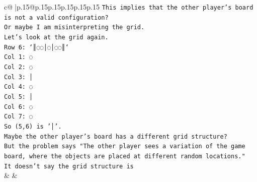 \documentclass{article}
\begin{document}
{\begin{supertabular}{c@{$\;$}|p{.15\linewidth}@{}p{.15\linewidth}p{.15\linewidth}p{.15\linewidth}p{.15\linewidth}p{.15\linewidth}}
{{{\texttt{This implies that the other player's board is not a valid configuration?} \\
\texttt{Or maybe I am misinterpreting the grid.} \\
\texttt{Let's look at the grid again.} \\
\texttt{Row 6: `║◌◌│◌│◌◌║`} \\
\texttt{Col 1: ◌} \\
\texttt{Col 2: ◌} \\
\texttt{Col 3: │} \\
\texttt{Col 4: ◌} \\
\texttt{Col 5: │} \\
\texttt{Col 6: ◌} \\
\texttt{Col 7: ◌} \\
\texttt{So (5,6) is '│'.} \\
\texttt{Maybe the other player's board has a different grid structure?} \\
\texttt{But the problem says "The other player sees a variation of the game board, where the objects are placed at different random locations."} \\
\texttt{It doesn't say the grid structure is} \\
            }
        }
    }
    & & \\ \\


\end{supertabular}}
\end{document}
